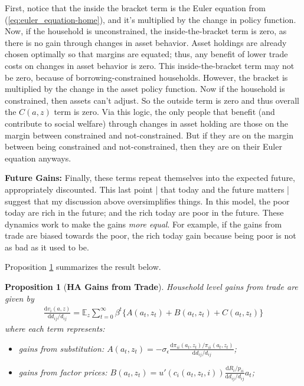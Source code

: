 \documentclass[12pt,pdftex]{article}
\newtheorem{prp}{Proposition}
\begin{document}
\begin{onehalfspacing}
First, notice that the inside the bracket term is the Euler equation from (\ref{eq:euler_equation-home}), and it's multiplied by the change in policy function. Now, if the household is unconstrained, the inside-the-bracket term is zero, as there is no gain through changes in asset behavior. Asset holdings are already chosen optimally so that margins are equated; thus, any benefit of lower trade costs on changes in asset behavior is zero. This inside-the-bracket term may not be zero, because of borrowing-constrained households. However, the bracket is multiplied by the change in the asset policy function. Now if the household is constrained, then assets can't adjust. So the outside term is zero and thus overall the $C(a,z)$ term is zero. Via this logic, the only people that benefit (and contribute to social welfare) through changes in asset holding are those on the margin between constrained and not-constrained. But if they are on the margin between being constrained and not-constrained, then they are on their Euler equation anyways.

\textbf{Future Gains:} Finally, these terms repeat themselves into the expected future, appropriately discounted. This last point | that today and the future matters | suggest that my discussion above oversimplifies things. In this model, the poor today are rich in the future; and the rich today are poor in the future. These dynamics work to make the gains \emph{more equal}. For example, if the gains from trade are biased towards the poor, the rich today gain because being poor is not as bad as it used to be.

Proposition \ref{prp:gains-trade} summarizes the result below.

\begin{prp}[\textbf{HA Gains from Trade}] \label{prp:gains-trade} Household level gains from trade are given by
{\footnotesize
\begin{align}
\nonumber
\frac{\mathrm{d} v_i(a, z)}{\mathrm{d} d_{ij} / d_{ij}} = \mathbb{E}_{z} \sum_{t = 0}^{\infty} \beta^{t} \bigg \{ A(a_{t},z_{t}) + B(a_{t},z_{t}) + C(a_{t},z_{t}) \bigg \}
\end{align}
}where each term represents:
\begin{itemize}
\item gains from substitution: $A(a_{t},z_{t}) = -\sigma_{\epsilon} \frac{\mathrm{d} \pi_{ii}(a_{t},z_{t}) / \pi_{ii}(a_{t},z_{t})}{\mathrm{d}d_{ij} / d_{ij}}$;

\item gains from factor prices: $B(a_{t},z_{t}) = u'(c_{i}(a_{t},z_{t},i))\frac{\mathrm{d} R_{i}/p_{ii}}{\mathrm{d} d_{ij} / d_{ij}}a_{t}$;


\end{itemize}
\end{prp}
\end{onehalfspacing}
\end{document}
